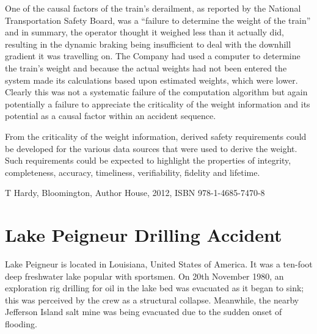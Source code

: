 One of the causal factors of the train’s derailment, as reported by the National Transportation Safety Board, was a ``failure to determine the weight of the train'' and in summary, the operator thought it weighed less than it actually did, resulting in the dynamic braking being insufficient to deal with the downhill gradient it was travelling on. The Company had used a computer to determine the train’s weight and because the actual weights had not been entered the system made its calculations based upon estimated weights, which were lower. Clearly this was not a systematic failure of the computation algorithm but again potentially a failure to appreciate the \gls{criticality} of the weight \gls{information} and its potential as a causal factor within an accident sequence.

From the \gls{criticality} of the weight \gls{information}, derived safety requirements could be developed for the various data sources that were used to derive the weight. Such requirements could be expected to highlight the properties of \gls{integrity}, \gls{completeness}, \gls{accuracy}, \gls{timeliness}, \gls{verifiability}, \gls{fidelity} and \gls{lifetime}.

T Hardy,  Bloomington, Author House, 2012, ISBN 978-1-4685-7470-8

\section{Lake Peigneur Drilling Accident} \label{bkm:incacc:peigneur}
Lake Peigneur is located in Louisiana, United States of America. It was a ten-foot deep freshwater lake popular with sportsmen. On 20th November 1980, an exploration rig drilling for oil in the lake bed was evacuated as it began to sink; this was perceived by the crew as a structural collapse. Meanwhile, the nearby Jefferson Island salt mine was being evacuated due to the sudden onset of flooding. 

